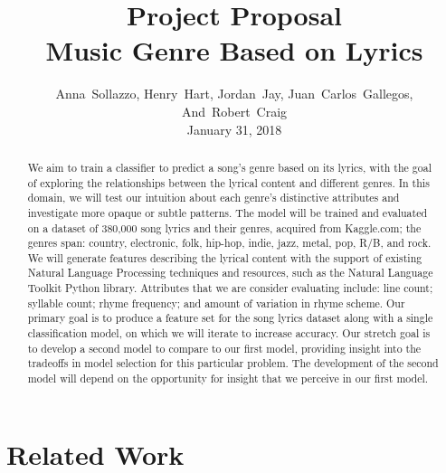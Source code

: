 \documentclass[journal]{IEEEtran}
\begin{document}
\title{Project Proposal\\Music Genre Based on Lyrics}

\author{Anna~Sollazzo,
        Henry~Hart,
        Jordan~Jay,
        Juan~Carlos~Gallegos,
        And~Robert~Craig \\ January 31, 2018}
        
\maketitle


\begin{abstract}

We aim to train a classifier to predict a song's genre based on its lyrics, with the goal of exploring the relationships between the lyrical content and different genres. In this domain, we will test our intuition about each genre's distinctive attributes and investigate more opaque or subtle patterns. The model will be trained and evaluated on a dataset of 380,000 song lyrics and their genres, acquired from Kaggle.com; the genres span: country, electronic, folk, hip-hop, indie, jazz, metal, pop, R/B, and rock. We will generate features describing the lyrical content with the support of existing Natural Language Processing techniques and resources, such as the Natural Language Toolkit Python library. Attributes that we are consider evaluating include: line count; syllable count; rhyme frequency; and amount of variation in rhyme scheme. Our primary goal is to produce a feature set for the song lyrics dataset along with a single classification model, on which we will iterate to increase accuracy. Our stretch goal is to develop a second model to compare to our first model, providing insight into the tradeoffs in model selection for this particular problem. The development of the second model will depend on the opportunity for insight that we perceive in our first model.


\end{abstract}


\section{Related Work}
\end{document}
